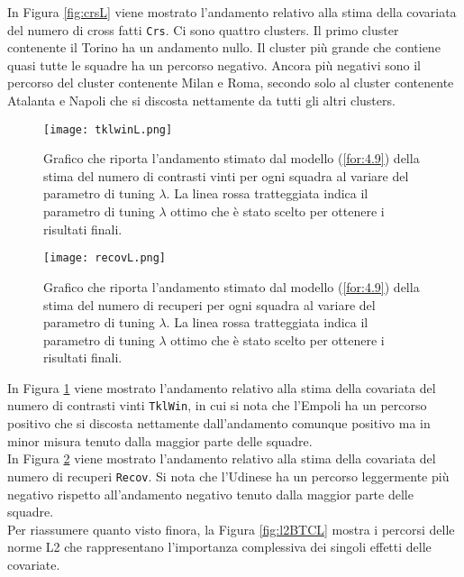 In Figura \ref{fig:crsL} viene mostrato l'andamento relativo alla stima della covariata del numero di cross fatti \texttt{Crs}. Ci sono quattro clusters. Il primo cluster contenente il Torino ha un andamento nullo. Il cluster più grande che contiene quasi tutte le squadre ha un percorso negativo. Ancora più negativi sono il percorso del cluster contenente Milan e Roma, secondo solo al cluster contenente Atalanta e Napoli che si discosta nettamente da tutti gli altri clusters.

\begin{figure}[htbp]
	\begin{center}
		\texttt{[image: tklwinL.png]}
		\caption{Grafico che riporta l'andamento stimato dal modello (\ref{for:4.9}) della stima del numero di contrasti vinti per ogni squadra al variare del parametro di tuning $\lambda$. La linea rossa tratteggiata indica il parametro di tuning $\lambda$ ottimo che è stato scelto per ottenere i risultati finali.} \label{fig:tklwinL}
	\end{center}
\end{figure}

\begin{figure}[htbp]
	\begin{center}
		\texttt{[image: recovL.png]}
		\caption{Grafico che riporta l'andamento stimato dal modello (\ref{for:4.9}) della stima del numero di recuperi per ogni squadra al variare del parametro di tuning $\lambda$. La linea rossa tratteggiata indica il parametro di tuning $\lambda$ ottimo che è stato scelto per ottenere i risultati finali.} \label{fig:recovL}
	\end{center}
\end{figure}
In Figura \ref{fig:tklwinL} viene mostrato l'andamento relativo alla stima della covariata del numero di contrasti vinti \texttt{TklWin}, in cui si nota che l'Empoli ha un percorso positivo che si discosta nettamente dall'andamento comunque positivo ma in minor misura tenuto dalla maggior parte delle squadre.\\
In Figura \ref{fig:recovL} viene mostrato l'andamento relativo alla stima della covariata del numero di recuperi \texttt{Recov}. Si nota che l'Udinese ha un percorso leggermente più negativo rispetto all'andamento negativo tenuto dalla maggior parte delle squadre.\\

Per riassumere quanto visto finora, la Figura \ref{fig:l2BTCL} mostra i percorsi delle norme L2 che rappresentano l'importanza complessiva dei singoli effetti delle covariate.

